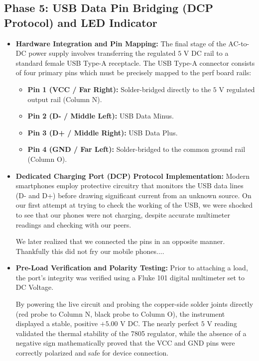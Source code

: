 \documentclass[journal,12pt,onecolumn]{IEEEtran}
\begin{document}
\subsection*{\textbf{Phase 5:} USB Data Pin Bridging (DCP Protocol) and LED Indicator}
\begin{itemize}
   
\item\textbf{Hardware Integration and Pin Mapping:}
The final stage of the AC-to-DC power supply involves transferring the regulated $5\text{ V}$ DC rail to a standard female USB Type-A receptacle. The USB Type-A connector consists of four primary pins which must be precisely mapped to the perf board rails:
\begin{itemize}
    \item \textbf{Pin 1 (VCC / Far Right):} Solder-bridged directly to the $5\text{ V}$ regulated output rail (Column N).
    \item \textbf{Pin 2 (D- / Middle Left):} USB Data Minus.
    \item \textbf{Pin 3 (D+ / Middle Right):} USB Data Plus.
    \item \textbf{Pin 4 (GND / Far Left):} Solder-bridged to the common ground rail (Column O).
\end{itemize}

\item\textbf{Dedicated Charging Port (DCP) Protocol Implementation:}
Modern smartphones employ protective circuitry that monitors the USB data lines (D- and D+) before drawing significant current from an unknown source. On our first attempt at trying to check the working of the USB, we were shocked to see that our phones were not charging, despite accurate multimeter readings and checking with our peers.

We later realized that we connected the pins in an opposite manner. Thankfully this did not fry our mobile phones....

\item\textbf{Pre-Load Verification and Polarity Testing:}
Prior to attaching a load, the port's integrity was verified using a Fluke 101 digital multimeter set to DC Voltage. 

By powering the live circuit and probing the copper-side solder joints directly (red probe to Column N, black probe to Column O), the instrument displayed a stable, positive $+5.00\text{ V}$ DC. The nearly perfect $5\text{ V}$ reading validated the thermal stability of the 7805 regulator, while the absence of a negative sign mathematically proved that the VCC and GND pins were correctly polarized and safe for device connection.


\end{itemize}
\end{document}
